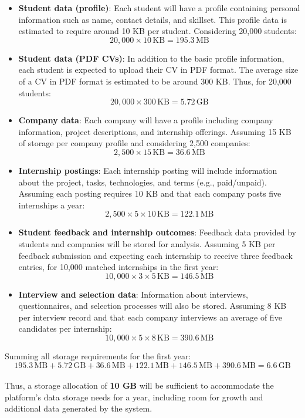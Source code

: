 \begin{itemize}
    \item \textbf{Student data (profile)}: Each student will have a profile containing personal information such as name, contact details, and skillset. This profile data is estimated to require around 10 KB per student. Considering 20,000 students:
    \[
    20,000 \times 10 \, \text{KB} = 195.3 \, \text{MB}
    \]
    
    \item \textbf{Student data (PDF CVs)}: In addition to the basic profile information, each student is expected to upload their CV in PDF format. The average size of a CV in PDF format is estimated to be around 300 KB. Thus, for 20,000 students:
    \[
    20,000 \times 300 \, \text{KB} = 5.72 \, \text{GB}
    \]
    
    \item \textbf{Company data}: Each company will have a profile including company information, project descriptions, and internship offerings. Assuming 15 KB of storage per company profile and considering 2,500 companies:
    \[
    2,500 \times 15 \, \text{KB} = 36.6 \, \text{MB}
    \]
    
    \item \textbf{Internship postings}: Each internship posting will include information about the project, tasks, technologies, and terms (e.g., paid/unpaid). Assuming each posting requires 10 KB and that each company posts five internships a year:
    \[
    2,500 \times 5 \times 10 \, \text{KB} = 122.1 \, \text{MB}
    \]
    
    \item \textbf{Student feedback and internship outcomes}: Feedback data provided by students and companies will be stored for analysis. Assuming 5 KB per feedback submission and expecting each internship to receive three feedback entries, for 10,000 matched internships in the first year:
    \[
    10,000 \times 3 \times 5 \, \text{KB} = 146.5 \, \text{MB}
    \]
    
    \item \textbf{Interview and selection data}: Information about interviews, questionnaires, and selection processes will also be stored. Assuming 8 KB per interview record and that each company interviews an average of five candidates per internship:
    \[
    10,000 \times 5 \times 8 \, \text{KB} = 390.6 \, \text{MB}
    \]
\end{itemize}

Summing all storage requirements for the first year:
\[
195.3 \, \text{MB} + 5.72 \, \text{GB} + 36.6 \, \text{MB} + 122.1 \, \text{MB} + 146.5 \, \text{MB} + 390.6 \, \text{MB} = 6.6 \, \text{GB}
\]\\
Thus, a storage allocation of \textbf{10 GB} will be sufficient to accommodate the platform's data storage needs for a year, including room for growth and additional data generated by the system.



